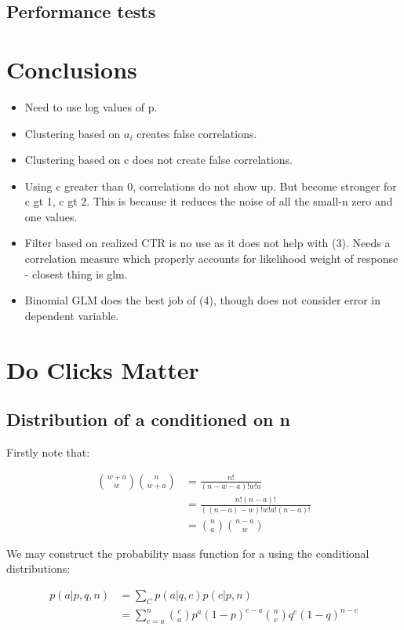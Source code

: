 \documentclass[12pt]{article}
\begin{document}
\subsection{Performance tests}

\section{Conclusions}

\begin{itemize}
	\item Need to use log values of p.
	\item Clustering based on $a_i$ creates false correlations.
	\item Clustering based on c does not create false correlations.
	\item Using c greater than 0, correlations do not show up. But become stronger for c gt 1, c gt 2. This is because it reduces the noise of all the small-n zero and one values.
	\item Filter based on realized CTR is no use as it does not help with (3). Needs a correlation measure which properly accounts for likelihood weight of response - closest thing is glm.
	\item Binomial GLM does the best job of (4), though does not consider error in dependent variable.
\end{itemize}

\pagebreak

\section{Do Clicks Matter}

\subsection{Distribution of a conditioned on n}

Firstly note that:

\begin{align}
{w+a \choose w}{n \choose w+a} &= \frac{n!}{(n-w-a)!w!a} \\
	&= \frac{n!(n-a)!}{((n-a)-w)!w!a!(n-a)!} \\
	&=  {n \choose a}{n-a \choose w}
\end{align}

We may construct the probability mass function for a using the conditional distributions:

\begin{align}
p(a|p,q,n) &= \sum_C p(a|q,c)p(c|p,n) \\
 &= \sum_{c=a}^n {c \choose a} p^a(1-p)^{c-a} {n \choose c} q^c (1-q)^{n-c}
\end{align}
\end{document}
